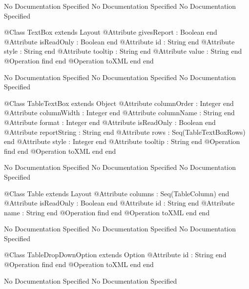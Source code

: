 No Documentation Specified
No Documentation Specified
No Documentation Specified
\begin{Interface}
@Class TextBox extends Layout
  @Attribute givesReport : Boolean end
  @Attribute isReadOnly : Boolean end
  @Attribute id : String end
  @Attribute style : String end
  @Attribute tooltip : String end
  @Attribute value : String end
  @Operation find end
  @Operation toXML end
end
\end{Interface}
No Documentation Specified
No Documentation Specified
No Documentation Specified
\begin{Interface}
@Class TableTextBox extends Object
  @Attribute columnOrder : Integer end
  @Attribute columnWidth : Integer end
  @Attribute columnName : String end
  @Attribute format : Integer end
  @Attribute isReadOnly : Boolean end
  @Attribute reportString : String end
  @Attribute rows : Seq(TableTextBoxRows) end
  @Attribute style : Integer end
  @Attribute tooltip : String end
  @Operation find end
  @Operation toXML end
end
\end{Interface}
No Documentation Specified
No Documentation Specified
No Documentation Specified
\begin{Interface}
@Class Table extends Layout
  @Attribute columns : Seq(TableColumn) end
  @Attribute isReadOnly : Boolean end
  @Attribute id : String end
  @Attribute name : String end
  @Operation find end
  @Operation toXML end
end
\end{Interface}
No Documentation Specified
No Documentation Specified
No Documentation Specified
\begin{Interface}
@Class TableDropDownOption extends Option
  @Attribute id : String end
  @Operation find end
  @Operation toXML end
end
\end{Interface}
No Documentation Specified
No Documentation Specified


